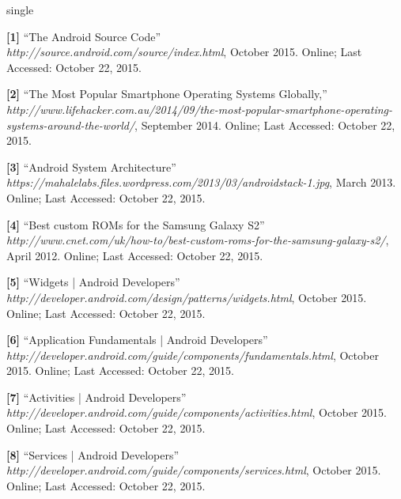 \documentclass[12pt]{uthesis-v12}  %
\begin{document}
\begin{referencelist}{single}
	
	\item \textbf{[1]} ``The Android Source Code''
	\\\emph{http://source.android.com/source/index.html}, October 2015. 
	Online; Last Accessed: October 22, 2015.	
	
	\item \textbf{[2]} ``The Most Popular Smartphone Operating Systems Globally,''
    \\\emph{http://www.lifehacker.com.au/2014/09/the-most-popular-smartphone-operating-systems-around-the-world/}, September 2014. 
    Online; Last Accessed: October 22, 2015.
	
	\item \textbf{[3]} ``Android System Architecture''
	\\\emph{https://mahalelabs.files.wordpress.com/2013/03/androidstack-1.jpg}, March 2013. 
	Online; Last Accessed: October 22, 2015. 
		
	\item \textbf{[4]} ``Best custom ROMs for the Samsung Galaxy S2''
	\\\emph{http://www.cnet.com/uk/how-to/best-custom-roms-for-the-samsung-galaxy-s2/}, April 2012. 
	Online; Last Accessed: October 22, 2015. 
		
	\item \textbf{[5]} ``Widgets | Android Developers''
	\\\emph{http://developer.android.com/design/patterns/widgets.html}, October 2015. 
	Online; Last Accessed: October 22, 2015.
		
	\item \textbf{[6]} ``Application Fundamentals | Android Developers''
	\\\emph{http://developer.android.com/guide/components/fundamentals.html}, October 2015. 
	Online; Last Accessed: October 22, 2015.
		
	\item \textbf{[7]} ``Activities | Android Developers''
	\\\emph{http://developer.android.com/guide/components/activities.html}, October 2015. 
	Online; Last Accessed: October 22, 2015.					     

	\item \textbf{[8]} ``Services | Android Developers''
	\\\emph{http://developer.android.com/guide/components/services.html}, October 2015. 
	Online; Last Accessed: October 22, 2015.
	

\end{referencelist}
\end{document}
